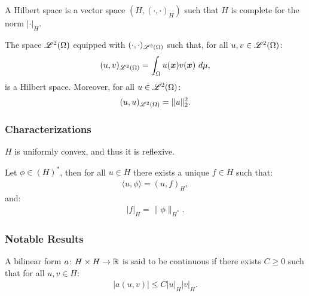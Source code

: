 \begin{definition}
    A Hilbert space is a vector space $(H, (\cdot, \cdot)_H)$ such that $H$ is complete for the norm $\lvert \cdot \rvert_H$.
\end{definition}

\begin{remark}
    The space $\mathscr{L}^{2}(\Omega)$ equipped with $(\cdot, \cdot)_{\mathscr{L}^{2}(\Omega)}$ such that, for all $u, v \in \mathscr{L}^{2}(\Omega)$:
    \begin{gather}
        (u, v)_{\mathscr{L}^{2}(\Omega)} = \int_{\Omega} u(\bm{x}) v(\bm{x}) ~ d \mu,
    \end{gather}
    is a Hilbert space. Moreover, for all $u \in \mathscr{L}^{2}(\Omega)$:
    \begin{gather}
        (u, u)_{\mathscr{L}^{2}(\Omega)} = \lVert u \rVert_2^2.
    \end{gather}
\end{remark}

\subsubsection{Characterizations}

\begin{theorem}
    $H$ is uniformly convex, and thus it is reflexive.
\end{theorem}

\begin{theorem}
    Let $\phi \in (H)^*$, then for all $u \in H$ there exists a unique $f \in H$ such that:
    \begin{gather}
        \langle u, \phi \rangle = (u, f)_H,
    \end{gather}
    and:
    \begin{gather}
        \lvert f \rvert_H = \lVert \phi \rVert_{H^{*}}.
    \end{gather}
\end{theorem}

\subsubsection{Notable Results}

\begin{definition}
    A bilinear form $a \colon H \times H \rightarrow \mathbb{R}$ is said to be continuous if there exists $C \geq 0$ such that for all $u, v \in H$:
    \begin{gather}
        \lvert a(u, v) \rvert \leq C \lvert u \rvert_H \lvert v \rvert_H.
    \end{gather}
\end{definition}


